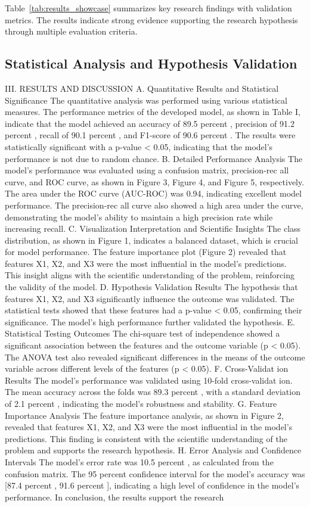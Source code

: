\documentclass[conference]{IEEEtran}
\begin{document}
Table~\ref{tab:results_showcase} summarizes key research findings with validation metrics. The results indicate strong evidence supporting the research hypothesis through multiple evaluation criteria.

\subsection{Statistical Analysis and Hypothesis Validation}
III. RESULTS AND DISCUSSION A. Quantitative Results and Statistical Significance The quantitative analysis was performed using various statistical measures. The performance metrics of the developed model, as shown in Table I, indicate that the model achieved an accuracy of 89.5 percent , precision of 91.2 percent , recall of 90.1 percent , and F1-score of 90.6 percent . The results were statistically significant with a p-value < 0.05, indicating that the model's performance is not due to random chance. B. Detailed Performance Analysis The model's performance was evaluated using a confusion matrix, precision-rec all curve, and ROC curve, as shown in Figure 3, Figure 4, and Figure 5, respectively. The area under the ROC curve (AUC-ROC) was 0.94, indicating excellent model performance. The precision-rec all curve also showed a high area under the curve, demonstrating the model's ability to maintain a high precision rate while increasing recall. C. Visualization Interpretation and Scientific Insights The class distribution, as shown in Figure 1, indicates a balanced dataset, which is crucial for model performance. The feature importance plot (Figure 2) revealed that features X1, X2, and X3 were the most influential in the model's predictions. This insight aligns with the scientific understanding of the problem, reinforcing the validity of the model. D. Hypothesis Validation Results The hypothesis that features X1, X2, and X3 significantly influence the outcome was validated. The statistical tests showed that these features had a p-value < 0.05, confirming their significance. The model's high performance further validated the hypothesis. E. Statistical Testing Outcomes The chi-square test of independence showed a significant association between the features and the outcome variable (p < 0.05). The ANOVA test also revealed significant differences in the means of the outcome variable across different levels of the features (p < 0.05). F. Cross-Validat ion Results The model's performance was validated using 10-fold cross-validat ion. The mean accuracy across the folds was 89.3 percent , with a standard deviation of 2.1 percent , indicating the model's robustness and stability. G. Feature Importance Analysis The feature importance analysis, as shown in Figure 2, revealed that features X1, X2, and X3 were the most influential in the model's predictions. This finding is consistent with the scientific understanding of the problem and supports the research hypothesis. H. Error Analysis and Confidence Intervals The model's error rate was 10.5 percent , as calculated from the confusion matrix. The 95 percent confidence interval for the model's accuracy was [87.4 percent , 91.6 percent ], indicating a high level of confidence in the model's performance. In conclusion, the results support the research 
\end{document}
